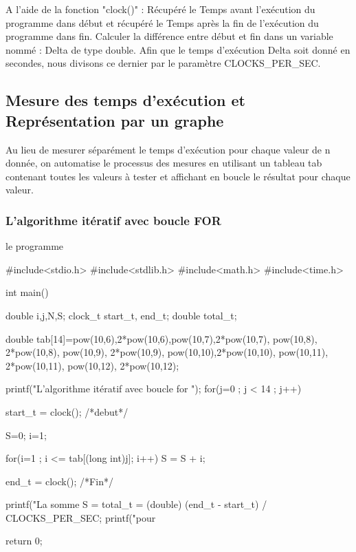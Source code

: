 \documentclass[•]{article}
\begin{document}
\textrm{A l'aide de la fonction "clock()" :
Récupéré le Temps avant l'exécution du programme dans début et
récupéré le Temps après la fin de l'exécution du programme dans fin.}
\textrm{Calculer la différence entre début et fin dans un variable nommé : Delta de type double.} 
\textrm{Afin que le temps d'exécution Delta soit donné en secondes, nous divisons ce dernier par le paramètre CLOCKS\_PER\_SEC.}



\subsection{Mesure des temps d'exécution et Représentation par un graphe}
Au lieu de mesurer séparément le temps d'exécution pour chaque valeur de n donnée, on automatise le processus des mesures en utilisant un tableau tab contenant toutes les valeurs à tester et affichant en boucle le résultat pour chaque valeur.
\subsubsection{L'algorithme itératif avec boucle FOR}
le programme

\begin{sql}
 #include<stdio.h>
 #include<stdlib.h>
 #include<math.h>
 #include<time.h>
 
 int main()
 {
 	double i,j,N,S;
	clock_t start_t, end_t;
    double total_t;
	 
	double tab[14]={pow(10,6),2*pow(10,6),pow(10,7),2*pow(10,7), pow(10,8), 2*pow(10,8),	pow(10,9), 2*pow(10,9), pow(10,10),2*pow(10,10), pow(10,11), 2*pow(10,11), pow(10,12), 2*pow(10,12)};
	
	printf("L'algorithme itératif avec boucle for \n\n");
	for(j=0 ; j < 14 ; j++) {
	
        start_t = clock();			/*debut*/
        
        S=0; i=1;
        
		for(i=1 ; i <= tab[(long int)j]; i++)
			 S = S + i;
		
        end_t = clock();			/*Fin*/
        
        printf("La somme S = %
        total_t = (double) (end_t - start_t) / CLOCKS_PER_SEC;
        printf("pour %
    }
	return 0;
 }
\end{sql}
\end{document}
